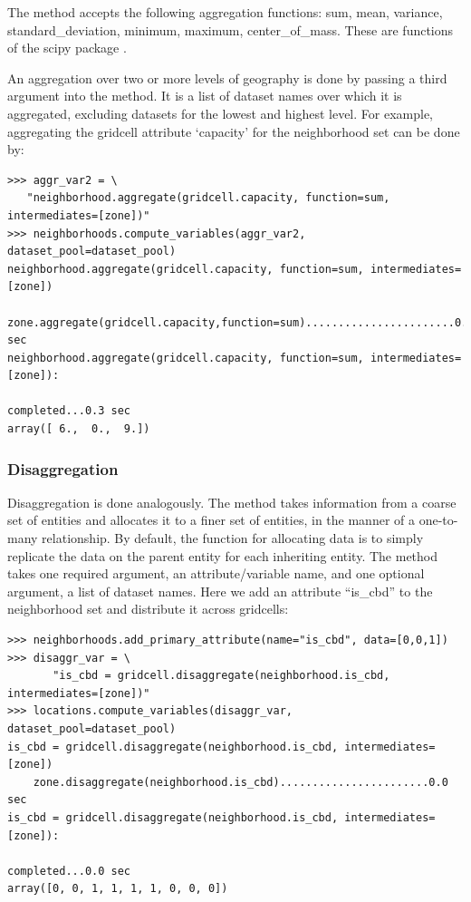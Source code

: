 The  method accepts the following aggregation functions:
sum, mean, variance, standard_deviation, minimum, maximum,
center_of_mass. These are functions of the scipy package
.

An aggregation over two or more levels of geography is done by passing a
third argument into the  method. It is a list of dataset
  names over which it is aggregated, excluding datasets
  for the lowest and highest level. For example, aggregating
the gridcell attribute `capacity' for the neighborhood set
can be done by:
\begin{verbatim}
>>> aggr_var2 = \
   "neighborhood.aggregate(gridcell.capacity, function=sum, intermediates=[zone])"
>>> neighborhoods.compute_variables(aggr_var2, dataset_pool=dataset_pool)
neighborhood.aggregate(gridcell.capacity, function=sum, intermediates=[zone])
    zone.aggregate(gridcell.capacity,function=sum).......................0.0 sec
neighborhood.aggregate(gridcell.capacity, function=sum, intermediates=[zone]):
                                                            completed...0.3 sec
array([ 6.,  0.,  9.])
\end{verbatim}

\subsubsection{Disaggregation}

Disaggregation is done analogously. The  method takes
information from a coarse set of entities and allocates it to a finer set of
entities, in the manner of a one-to-many relationship. By default, the function
for allocating data is to simply replicate the data on the parent entity for
each inheriting entity. The method takes one required argument, an
attribute/variable
  name, and one optional argument, a list of
dataset names. Here we add an attribute
``is_cbd'' to the neighborhood set and distribute it across gridcells:

\begin{verbatim}
>>> neighborhoods.add_primary_attribute(name="is_cbd", data=[0,0,1])
>>> disaggr_var = \
       "is_cbd = gridcell.disaggregate(neighborhood.is_cbd, intermediates=[zone])"
>>> locations.compute_variables(disaggr_var, dataset_pool=dataset_pool)
is_cbd = gridcell.disaggregate(neighborhood.is_cbd, intermediates=[zone])
    zone.disaggregate(neighborhood.is_cbd).......................0.0 sec
is_cbd = gridcell.disaggregate(neighborhood.is_cbd, intermediates=[zone]):
                                                           completed...0.0 sec
array([0, 0, 1, 1, 1, 1, 0, 0, 0])

\end{verbatim}

